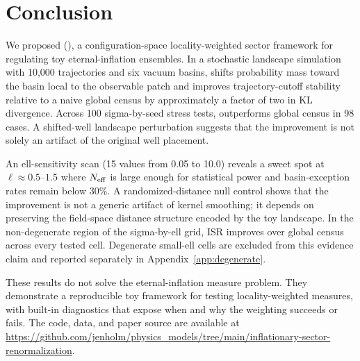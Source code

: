 \section{Conclusion}
\label{sec:conclusion}

We proposed \isr (\ISR), a configuration-space locality-weighted sector framework for
regulating toy eternal-inflation ensembles.
In a stochastic landscape simulation with 10,000 trajectories and six
vacuum basins, \ISR shifts probability mass toward the basin local to the
observable patch and improves trajectory-cutoff stability relative to a naive
global census by approximately a factor of two in KL divergence.
Across 100 sigma-by-seed stress tests, \ISR outperforms global census in
98 cases.
A shifted-well landscape perturbation suggests that the improvement is not
solely an artifact of the original well placement.

An ell-sensitivity scan (15 values from 0.05 to 10.0) reveals a sweet spot at
$\ell \approx 0.5$--$1.5$ where $N_{\rm eff}$ is large enough for statistical
power and basin-exception rates remain below 30\%.
A randomized-distance null control shows that the improvement is not a generic
artifact of kernel smoothing; it depends on preserving the field-space distance
structure encoded by the toy landscape.
In the non-degenerate region of the sigma-by-ell grid, ISR improves over global
census across every tested cell. Degenerate small-ell cells are excluded from
this evidence claim and reported separately in Appendix~\ref{app:degenerate}.

These results do not solve the eternal-inflation measure problem.
They demonstrate a reproducible toy framework for testing locality-weighted
measures, with built-in diagnostics that expose when and why the weighting
succeeds or fails.
The code, data, and paper source are available at
\url{https://github.com/jenholm/physics_models/tree/main/inflationary-sector-renormalization}.
